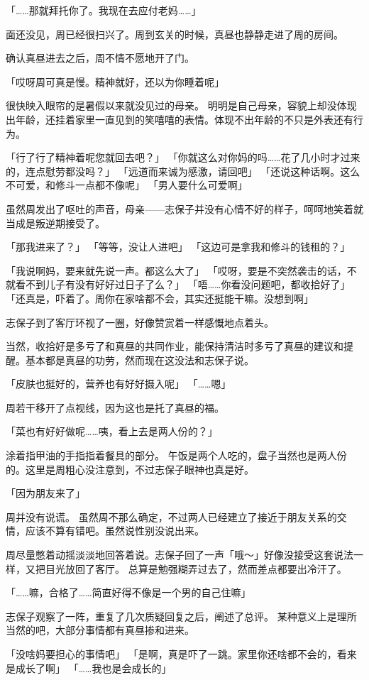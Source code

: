 「……那就拜托你了。我现在去应付老妈……」

面还没见，周已经很扫兴了。周到玄关的时候，真昼也静静走进了周的房间。

确认真昼进去之后，周不情不愿地开了门。

「哎呀周可真是慢。精神就好，还以为你睡着呢」

很快映入眼帘的是暑假以来就没见过的母亲。
明明是自己母亲，容貌上却没体现出年龄，还挂着家里一直见到的笑嘻嘻的表情。体现不出年龄的不只是外表还有行为。

「行了行了精神着呢您就回去吧？」
「你就这么对你妈的吗……花了几小时才过来的，连点慰劳都没吗？」
「远道而来诚为感激，请回吧」
「还说这种话啊。这么不可爱，和修斗一点都不像呢」
「男人要什么可爱啊」

虽然周发出了呕吐的声音，母亲——志保子并没有心情不好的样子，呵呵地笑着就当成是叛逆期接受了。

「那我进来了？」
「等等，没让人进吧」
「这边可是拿我和修斗的钱租的？」

「我说啊妈，要来就先说一声。都这么大了」
「哎呀，要是不突然袭击的话，不就看不到儿子有没有好好过日子了么？」
「唔……你看没问题吧，都收拾好了」
「还真是，吓着了。周你在家啥都不会，其实还挺能干嘛。没想到啊」

志保子到了客厅环视了一圈，好像赞赏着一样感慨地点着头。

当然，收拾好是多亏了和真昼的共同作业，能保持清洁时多亏了真昼的建议和提醒。基本都是真昼的功劳，然而现在这没法和志保子说。

「皮肤也挺好的，营养也有好好摄入呢」
「……嗯」

周若干移开了点视线，因为这也是托了真昼的福。

「菜也有好好做呢……咦，看上去是两人份的？」

涂着指甲油的手指指着餐具的部分。
午饭是两个人吃的，盘子当然也是两人份的。这里是周粗心没注意到，不过志保子眼神也真是好。

「因为朋友来了」

周并没有说谎。
虽然周不那么确定，不过两人已经建立了接近于朋友关系的交情，应该不算有错吧。虽然说性别没说出来。

周尽量憋着动摇淡淡地回答着说。志保子回了一声「哦～」好像没接受这套说法一样，又把目光放回了客厅。
总算是勉强糊弄过去了，然而差点都要出冷汗了。

「……嘛，合格了……简直好得不像是一个男的自己住嘛」

志保子观察了一阵，重复了几次质疑回复之后，阐述了总评。
某种意义上是理所当然的吧，大部分事情都有真昼掺和进来。

「没啥妈要担心的事情吧」
「是啊，真是吓了一跳。家里你还啥都不会的，看来是成长了啊」
「……我也是会成长的」


